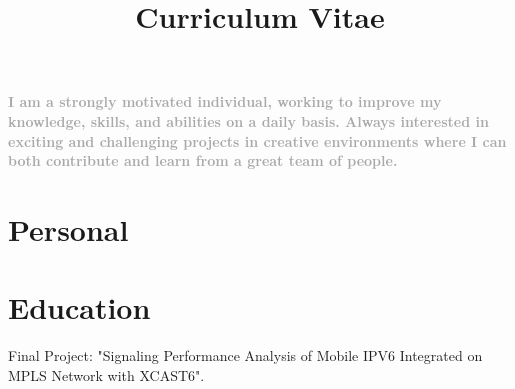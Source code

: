 \documentclass[10pt, a4paper]{moderncv}
\title{Curriculum Vitae}
\begin{document}
\maketitle

\begin{small}
    \textcolor{darkgray}{
    \textbf{I am a strongly motivated individual, working to improve my knowledge, skills, and abilities on a daily basis.
            Always interested in exciting and challenging projects in creative environments where I can both contribute
            and learn from a great team of people.}}
\end{small}


\section{Personal}


\section{Education}
{
    \begin{scriptsize}
        Final Project: "Signaling Performance Analysis of Mobile IPV6 Integrated on MPLS Network with XCAST6".
    \end{scriptsize}
}


\end{document}
